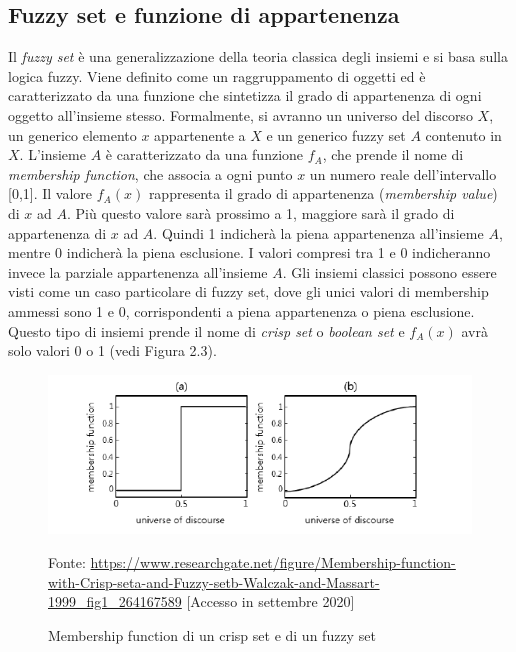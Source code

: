 \documentclass[11pt,  oneside, openany]{book}
\newcommand{\source}[1]{\caption*{Fonte: {#1}} }
\begin{document}
\subsection{Fuzzy set e funzione di appartenenza}
Il \textit{fuzzy set} è una generalizzazione della teoria classica degli insiemi e si basa sulla logica fuzzy. Viene definito come un raggruppamento di oggetti ed è caratterizzato da una funzione che sintetizza il grado di appartenenza di ogni oggetto all'insieme stesso. Formalmente, si avranno un universo del discorso $X$, un generico elemento $x$  appartenente a $X$ e un generico fuzzy set $A$ contenuto in $X$. L'insieme $A$ è caratterizzato da una funzione $f_A$, che prende il nome di \textit{membership function}, che associa a ogni punto $x$ un numero reale dell'intervallo [0,1]. Il valore $f_A(x)$ rappresenta il grado di appartenenza (\textit {membership value}) di $x$ ad $A$. Più questo valore sarà prossimo a 1, maggiore sarà il grado di appartenenza di $x$ ad $A$. Quindi 1 indicherà la piena appartenenza all'insieme $A$, mentre 0 indicherà la piena esclusione. I valori compresi tra 1 e 0 indicheranno invece la parziale appartenenza all'insieme $A$. Gli insiemi classici possono essere visti come un caso particolare di fuzzy set, dove gli unici valori di membership ammessi sono 1 e 0, corrispondenti a piena appartenenza o piena esclusione. Questo tipo di insiemi prende il nome di \textit{crisp set} o \textit{boolean set} e $f_A(x)$ avrà solo valori 0 o 1 (vedi Figura 2.3). 


\begin{figure}[h!]
\begin{center}
  \includegraphics[width=13cm]{Immagini/membfunctcrispvsfuzzy.png}\\
  \caption{Membership function di un crisp set e di un fuzzy set}
  \source{\url{https://www.researchgate.net/figure/Membership-function-with-Crisp-seta-and-Fuzzy-setb-Walczak-and-Massart-1999_fig1_264167589} [Accesso in settembre 2020]}
\end{center}
\end{figure}
\end{document}
